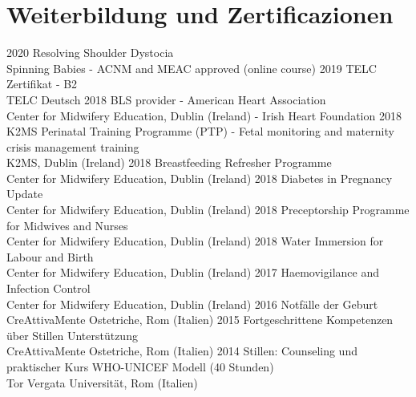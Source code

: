 \documentclass[11pt]{friggeri-cv}
\begin{document}
\section{Weiterbildung und Zertificazionen}
\begin{entrylist}
  \entry
    {2020}
    {Resolving Shoulder Dystocia}
    {\\Spinning Babies - ACNM and MEAC approved (online course)}
    {\vspace{-10pt}}
  \entry
    {2019}
    {TELC Zertifikat - B2}
    {\\TELC Deutsch}
    {\vspace{-10pt}}
  \entry
    {2018}
    {BLS provider - American Heart Association}
    {\\Center for Midwifery Education, Dublin (Ireland) - Irish Heart Foundation}
    {\vspace{-10pt}}
  \entry
    {2018}
    {K2MS Perinatal Training Programme (PTP) - Fetal monitoring and maternity crisis management training}
    {\\K2MS, Dublin (Ireland)}
    {\vspace{-10pt}}
  \entry
    {2018}
    {Breastfeeding Refresher Programme}
    {\\Center for Midwifery Education, Dublin (Ireland)}
    {\vspace{-10pt}}
  \entry
    {2018}
    {Diabetes in Pregnancy Update}
    {\\Center for Midwifery Education, Dublin (Ireland)}
    {\vspace{-10pt}}
  \entry
    {2018}
    {Preceptorship Programme for Midwives and Nurses}
    {\\Center for Midwifery Education, Dublin (Ireland)}
    {\vspace{-10pt}}
  \entry
    {2018}
    {Water Immersion for Labour and Birth}
    {\\Center for Midwifery Education, Dublin (Ireland)}
    {\vspace{-10pt}}
  \entry
    {2017}
    {Haemovigilance and Infection Control}
    {\\Center for Midwifery Education, Dublin (Ireland)}
    {\vspace{-10pt}}
  \entry
    {2016}
    {Notf\"{a}lle der Geburt}
    {\\CreAttivaMente Ostetriche, Rom (Italien)}
    {\vspace{-10pt}}
  \entry
    {2015}
    {Fortgeschrittene Kompetenzen \"{u}ber Stillen Unterst\"{u}tzung}
    {\\CreAttivaMente Ostetriche, Rom (Italien)}
    {\vspace{-10pt}}
  \entry
    {2014}
    {Stillen: Counseling und praktischer Kurs WHO-UNICEF Modell (40 Stunden)}
    {\\Tor Vergata Universit\"{a}t, Rom (Italien)}
    {\vspace{-10pt}}
\end{entrylist}
\end{document}
